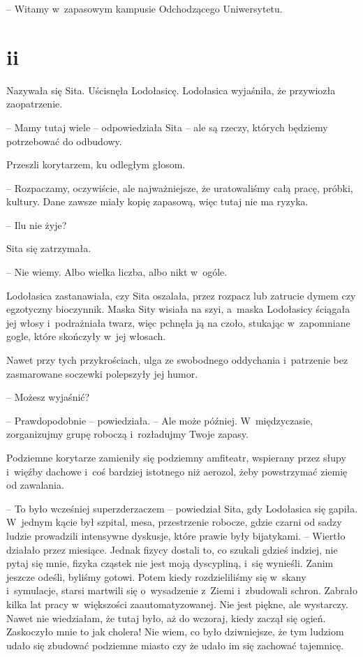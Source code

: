 \documentclass[oneside,polish,11pt,sfheadings]{mwbk}
\begin{document}
-- Witamy w~zapasowym kampusie Odchodzącego
Uniwersytetu.

\chapter*{ii}

Nazywała się Sita. Uścisnęła Lodołasicę. Lodołasica wyjaśniła, że
przywiozła zaopatrzenie.

-- Mamy tutaj wiele -- odpowiedziała Sita -- ale są rzeczy, których
będziemy potrzebować do odbudowy.

Przeszli korytarzem, ku odległym głosom. 

-- Rozpaczamy, oczywiście, ale
najważniejsze, że uratowaliśmy całą pracę, próbki, kultury. Dane zawsze
miały kopię zapasową, więc tutaj nie ma ryzyka.

-- Ilu nie żyje?

Sita się zatrzymała. 

-- Nie wiemy. Albo wielka liczba, albo nikt w~ogóle.

Lodołasica zastanawiała, czy Sita oszalała, przez rozpacz lub zatrucie
dymem czy egzotyczny bioczynnik. Maska Sity wisiała na szyi, a~maska
Lodołasicy ściągała jej włosy i~podrażniała twarz, więc pchnęła ją na
czoło, stukając w~zapomniane gogle, które skończyły w~jej włosach.

Nawet przy tych przykrościach, ulga ze swobodnego oddychania i~patrzenie
bez zasmarowane soczewki polepszyły jej humor.

-- Możesz wyjaśnić?

-- Prawdopodobnie -- powiedziała. -- Ale może później. W~międzyczasie,
zorganizujmy grupę roboczą i~rozładujmy Twoje zapasy.

Podziemne korytarze zamieniły się podziemny amfiteatr, wspierany przez
słupy i~więźby dachowe i~coś bardziej istotnego niż aerozol, żeby
powstrzymać ziemię od zawalania.

-- To było wcześniej superzderzaczem -- powiedział Sita, gdy Lodołasica
się gapiła. W~jednym kącie był szpital, mesa, przestrzenie robocze,
gdzie czarni od sadzy ludzie prowadzili intensywne dyskusje, które
prawie były bijatykami. -- Wiertło działało przez miesiące. Jednak fizycy
dostali to, co szukali gdzieś indziej, nie pytaj się mnie, fizyka
cząstek nie jest moją dyscypliną, i~się wynieśli. Zanim jeszcze odeśli,
byliśmy gotowi. Potem kiedy rozdzieliliśmy się w~skany i~symulacje,
starsi martwili się o~wysadzenie z~Ziemi i~zbudowali schron. Zabrało
kilka lat pracy w~większości zaautomatyzowanej. Nie jest piękne, ale
wystarczy. Nawet nie wiedziałam, że tutaj było, aż do wczoraj, kiedy
zaczął się ogień. Zaskoczyło mnie to jak cholera! Nie wiem, co było
dziwniejsze, że tym ludziom udało się zbudować podziemne miasto czy że
udało im się zachować tajemnicę.
\end{document}
